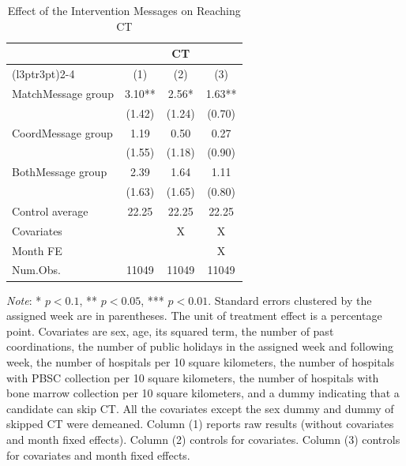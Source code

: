 \documentclass[12pt, a4paper]{article}
\begin{document}
\begin{table}
\centering\centering
\caption{\label{tab:test-lm}Effect of the Intervention Messages on Reaching CT}
\centering
\fontsize{9}{11}\selectfont
\begin{threeparttable}
\begin{tabular}[t]{>{\raggedright\arraybackslash}p{5cm}ccc}
\toprule
\multicolumn{1}{c}{ } & \multicolumn{3}{c}{CT} \\
\cmidrule(l{3pt}r{3pt}){2-4}
  & (1) & (2) & (3)\\
\midrule
MatchMessage group & \num{3.10}** & \num{2.56}* & \num{1.63}**\\
 & (\num{1.42}) & (\num{1.24}) & (\num{0.70})\\
CoordMessage group & \num{1.19} & \num{0.50} & \num{0.27}\\
 & (\num{1.55}) & (\num{1.18}) & (\num{0.90})\\
BothMessage group & \num{2.39} & \num{1.64} & \num{1.11}\\
 & (\num{1.63}) & (\num{1.65}) & (\num{0.80})\\
\midrule
Control average & 22.25 & 22.25 & 22.25\\
Covariates &  & X & X\\
Month FE &  &  & X\\
Num.Obs. & \num{11049} & \num{11049} & \num{11049}\\
\bottomrule
\end{tabular}
\begin{tablenotes}
\item \emph{Note}: * $p < 0.1$, ** $p < 0.05$, *** $p < 0.01$. Standard errors clustered by the assigned week are in parentheses. The unit of treatment effect is a percentage point. Covariates are sex, age, its squared term, the number of past coordinations, the number of public holidays in the assigned week and following week, the number of hospitals per 10 square kilometers, the number of hospitals with PBSC collection per 10 square kilometers, the number of hospitals with bone marrow collection per 10 square kilometers, and a dummy indicating that a candidate can skip CT. All the covariates except the sex dummy and dummy of skipped CT were demeaned. Column (1) reports raw results (without covariates and month fixed effects). Column (2) controls for covariates. Column (3) controls for covariates and month fixed effects.
\end{tablenotes}
\end{threeparttable}
\end{table}
\end{document}
